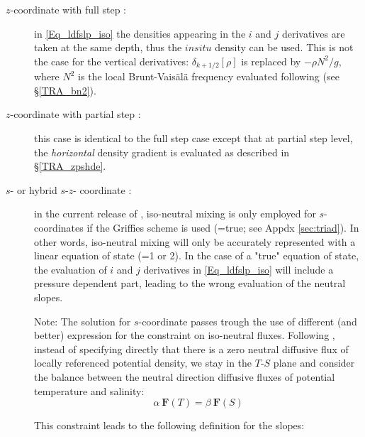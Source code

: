 \documentclass[NEMO_book]{subfiles}
\begin{document}
\begin{description}

\item[$z$-coordinate with full step : ] in \eqref{Eq_ldfslp_iso} the densities 
appearing in the $i$ and $j$ derivatives  are taken at the same depth, thus 
the $in situ$ density can be used. This is not the case for the vertical 
derivatives: $\delta_{k+1/2}[\rho]$ is replaced by $-\rho N^2/g$, where $N^2$ 
is the local Brunt-Vais\"{a}l\"{a} frequency evaluated following 
\citet{McDougall1987} (see \S\ref{TRA_bn2}). 

\item[$z$-coordinate with partial step : ] this case is identical to the full step 
case except that at partial step level, the \emph{horizontal} density gradient 
is evaluated as described in \S\ref{TRA_zpshde}.

\item[$s$- or hybrid $s$-$z$- coordinate : ] in the current release of \NEMO, 
iso-neutral mixing is only employed for $s$-coordinates if the
Griffies scheme is used (=true; see Appdx \ref{sec:triad}). 
In other words, iso-neutral mixing will only be accurately represented with a 
linear equation of state (=1 or 2). In the case of a "true" equation 
of state, the evaluation of $i$ and $j$ derivatives in \eqref{Eq_ldfslp_iso} 
will include a pressure dependent part, leading to the wrong evaluation of 
the neutral slopes.

Note: The solution for $s$-coordinate passes trough the use of different 
(and better) expression for the constraint on iso-neutral fluxes. Following 
\citet{Griffies_Bk04}, instead of specifying directly that there is a zero neutral 
diffusive flux of locally referenced potential density, we stay in the $T$-$S$ 
plane and consider the balance between the neutral direction diffusive fluxes 
of potential temperature and salinity:
\begin{equation}
\alpha \ \textbf{F}(T) = \beta \ \textbf{F}(S)
\end{equation}

This constraint leads to the following definition for the slopes:


\end{description}
\end{document}
